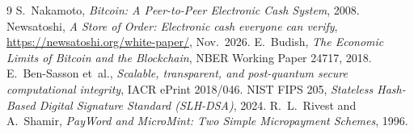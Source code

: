 \documentclass[11pt,a4paper]{article}
\begin{document}
\begin{thebibliography}{9}
 S.~Nakamoto, \emph{Bitcoin: A Peer-to-Peer Electronic Cash System}, 2008.
 Newsatoshi, \emph{A Store of Order: Electronic cash everyone can verify}, \url{https://newsatoshi.org/white-paper/}, Nov.\ 2026.
 E.~Budish, \emph{The Economic Limits of Bitcoin and the Blockchain}, NBER Working Paper 24717, 2018.
 E.~Ben-Sasson et~al., \emph{Scalable, transparent, and post-quantum secure computational integrity}, IACR ePrint 2018/046.
 NIST FIPS 205, \emph{Stateless Hash-Based Digital Signature Standard (SLH-DSA)}, 2024.
 R.~L.~Rivest and A.~Shamir, \emph{PayWord and MicroMint: Two Simple Micropayment Schemes}, 1996.
\end{thebibliography}
\end{document}
